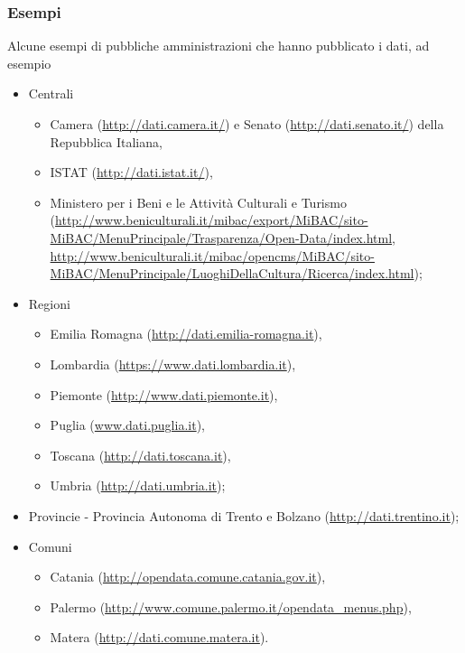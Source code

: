 \documentclass[8pt]{beamer}
\begin{document}
\begin{frame}
\frametitle{Esempi}
Alcune esempi di pubbliche amministrazioni che hanno pubblicato i dati, ad esempio
\vspace{\baselineskip}

\begin{itemize} [<+->]
 \item Centrali
 \begin{itemize}
  \item Camera (\url{http://dati.camera.it/}) e Senato (\url{http://dati.senato.it/}) della Repubblica Italiana,
  \item ISTAT (\url{http://dati.istat.it/}),  
  \item Ministero per i Beni e le Attivit\`a Culturali e Turismo (\url{http://www.beniculturali.it/mibac/export/MiBAC/sito-MiBAC/MenuPrincipale/Trasparenza/Open-Data/index.html}, \url{http://www.beniculturali.it/mibac/opencms/MiBAC/sito-MiBAC/MenuPrincipale/LuoghiDellaCultura/Ricerca/index.html});  
 \end{itemize}
 \item Regioni
 \begin{itemize}
  \item Emilia Romagna (\url{http://dati.emilia-romagna.it}),
  \item Lombardia (\url{https://www.dati.lombardia.it}), 
  \item Piemonte (\url{http://www.dati.piemonte.it}), 
  \item Puglia (\url{www.dati.puglia.it}),
  \item Toscana (\url{http://dati.toscana.it}), 
  \item Umbria (\url{http://dati.umbria.it});
 \end{itemize}
 \item Provincie - Provincia Autonoma di Trento e Bolzano (\url{http://dati.trentino.it});
 \item Comuni
 \begin{itemize}
  \item Catania (\url{http://opendata.comune.catania.gov.it}),
  \item Palermo (\url{http://www.comune.palermo.it/opendata_menus.php}),
  \item Matera (\url{http://dati.comune.matera.it}).
 \end{itemize}
\end{itemize}
\end{frame}
\end{document}
